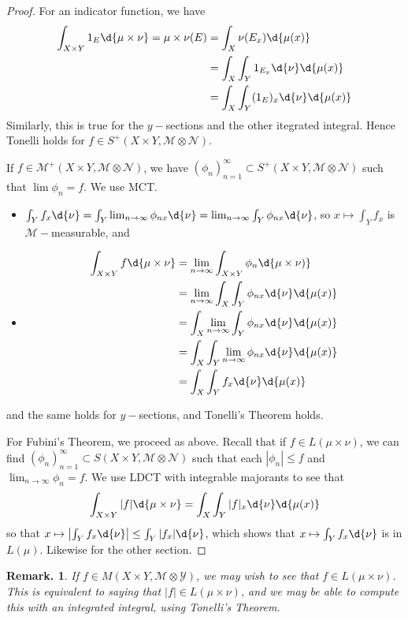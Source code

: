 \documentclass[11pt, a4paper]{memoir}
\theoremstyle{change}
\theoremstyle{plain}
\theoremstyle{nonumberplain}
\newtheorem{remark}{Remark.}
\newtheorem{proof}{Proof}
\begin{document}
\begin{proof}
    For an indicator function, we have
    \begin{align*}
        \int_{X\times Y}1_E\d{\mu\times\nu}=\mu\times\nu(E)&=\int_X\nu(E_x)\d{\mu(x)}\\
                                                           &=\int_X\int_Y1_{E_x}\d{\nu}\d{\mu(x)}\\
                                                           &= \int_X\int_Y(1_E)_x\d{\nu}\d{\mu(x)}
    \end{align*}
    Similarly, this is true for the $y-$sections and the other itegrated integral.
    Hence Tonelli holds for $f\in S^+(X\times Y,\mathcal{M}\otimes\mathcal{N})$.

    If $f\in\mathcal{M}^+(X\times Y,\mathcal{M}\otimes\mathcal{N})$, we have $(\phi_n)_{n=1}^\infty\subset S^+(X\times Y,\mathcal{M}\otimes\mathcal{N})$ such that $\lim\phi_n=f$.
    We use MCT.
    \begin{itemize}
        \item $\int_Y f_x\d{\nu}=\int_Y\lim_{n\to\infty}\phi_{nx}\d{\nu}=\lim_{n\to\infty}\int_Y\phi_{nx}\d{\nu}$, so $x\mapsto\int_Y f_x$ is $\mathcal{M}-$measurable, and
        \item
            \begin{align*}
                \int_{X\times Y}f\d{\mu\times\nu} &= \lim_{n\to\infty}\int_{X\times Y}\phi_n\d{\mu\times\nu)}\\
                                                  &= \lim_{n\to\infty}\int_X\int_Y\phi_{nx}\d{\nu}\d{\mu(x)}\\
                                                  &= \int_X\lim_{n\to\infty}\int_Y\phi_{nx}\d{\nu}\d{\mu(x)}\\
                                                  &= \int_X\int_Y\lim_{n\to\infty}\phi_{nx}\d{\nu}\d{\mu(x)}\\
                                                  &= \int_X\int_Y f_x\d{\nu}\d{\mu(x)}
            \end{align*}
    \end{itemize}
    and the same holds for $y-$sections, and Tonelli's Theorem holds.

    For Fubini's Theorem, we proceed as above.
    Recall that if $f\in L(\mu\times\nu)$, we can find $(\phi_n)_{n=1}^\infty\subset S(X\times Y,\mathcal{M}\otimes\mathcal{N})$ such that each $|\phi_n|\leq f$ and $\lim_{n\to\infty}\phi_n=f$.
    We use LDCT with integrable majorants to see that
    \begin{equation*}
        \int_{X\times Y}|f|\d{\mu\times\nu}=\int_X\int_Y|f|_x\d{\nu}\d{\mu(x)}
    \end{equation*}
    so that $x\mapsto\left\lvert\int_Yf_x\d{\nu}\right\rvert\leq\int_Y|f_x|\d{\nu}$, which shows that $x\mapsto\int_Yf_x\d{\nu}$ is in $L(\mu)$.
    Likewise for the other section.
\end{proof}
\begin{remark}
    If $f\in M(X\times Y,\mathcal{M}\otimes\mathcal{Y})$, we may wish to see that $f\in L(\mu\times\nu)$.
    This is equivalent to saying that $|f|\in L(\mu\times\nu)$, and we may be able to compute this with an integrated integral, using Tonelli's Theorem.
\end{remark}
\end{document}
